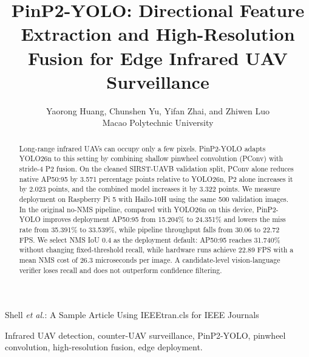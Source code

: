 \documentclass[lettersize,journal]{IEEEtran}
\begin{document}
\title{PinP2-YOLO: Directional Feature Extraction and High-Resolution Fusion for Edge Infrared UAV Surveillance}

\author{Yaorong Huang, Chunshen Yu, Yifan Zhai, and Zhiwen Luo\\Macao Polytechnic University}

%
{Shell \MakeLowercase{\textit{et al.}}: A Sample Article Using IEEEtran.cls for IEEE Journals}


\maketitle

\pdfpagewidth=210mm
\pdfpageheight=297mm
\setlength{\paperwidth}{210mm}
\setlength{\paperheight}{297mm}
\begin{abstract}
Long-range infrared UAVs can occupy only a few pixels. PinP2-YOLO adapts YOLO26n to this setting by combining shallow pinwheel convolution (PConv) with stride-4 P2 fusion. On the cleaned SIRST-UAVB validation split, PConv alone reduces native AP50:95 by 3.571 percentage points relative to YOLO26n, P2 alone increases it by 2.023 points, and the combined model increases it by 3.322 points. We measure deployment on Raspberry Pi 5 with Hailo-10H using the same 500 validation images. In the original no-NMS pipeline, compared with YOLO26n on this device, PinP2-YOLO improves deployment AP50:95 from 15.204\% to 24.351\% and lowers the miss rate from 35.391\% to 33.539\%, while pipeline throughput falls from 30.06 to 22.72 FPS. We select NMS IoU 0.4 as the deployment default: AP50:95 reaches 31.740\% without changing fixed-threshold recall, while hardware runs achieve 22.89 FPS with a mean NMS cost of 26.3 microseconds per image. A candidate-level vision-language verifier loses recall and does not outperform confidence filtering.
\end{abstract}
\begin{IEEEkeywords}
Infrared UAV detection, counter-UAV surveillance, PinP2-YOLO, pinwheel convolution, high-resolution fusion, edge deployment.
\end{IEEEkeywords}
\end{document}
